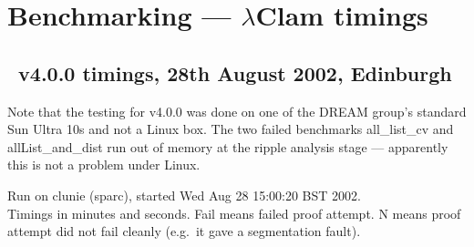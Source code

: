 \chapter{Benchmarking --- $\lambda$Clam timings}

\section{\lclam\ v4.0.0 timings, 28th August 2002, Edinburgh}
Note that the testing for v4.0.0 was done on one of the DREAM group's
standard Sun Ultra 10s and not a Linux box.  The two failed benchmarks
all\_list\_cv and allList\_and\_dist run out of memory at the ripple
analysis stage --- apparently this is not a problem under Linux.

Run on clunie (sparc), started Wed Aug 28 15:00:20 BST 2002.\\ 
Timings in minutes and seconds. Fail means failed proof attempt. 
N means proof attempt did not fail cleanly 
(e.g.\ it gave a segmentation fault). 
